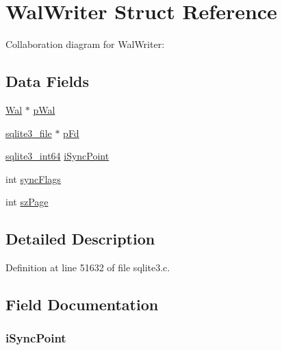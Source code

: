 \hypertarget{struct_wal_writer}{}\section{Wal\+Writer Struct Reference}
\label{struct_wal_writer}


Collaboration diagram for Wal\+Writer\+:
\subsection*{Data Fields}
\begin{DoxyCompactItemize}
\item 
\hyperlink{struct_wal}{Wal} $\ast$ \hyperlink{struct_wal_writer_ac5f3cfd978474a39e7462844ec1a6fe1}{p\+Wal}
\item 
\hyperlink{structsqlite3__file}{sqlite3\+\_\+file} $\ast$ \hyperlink{struct_wal_writer_ae44362cf35caac454319be8c145e374e}{p\+Fd}
\item 
\hyperlink{sqlite3_8c_a0a4d3e6c1ad46f90e746b920ab6ca0d2}{sqlite3\+\_\+int64} \hyperlink{struct_wal_writer_acdb124ba6cd2b23fde69c6e27a98e0c4}{i\+Sync\+Point}
\item 
int \hyperlink{struct_wal_writer_a3a81127b799c852f4dd1758b0390d48d}{sync\+Flags}
\item 
int \hyperlink{struct_wal_writer_a0ead96b04a1cc6dc6ec781782e82d052}{sz\+Page}
\end{DoxyCompactItemize}


\subsection{Detailed Description}


Definition at line 51632 of file sqlite3.\+c.



\subsection{Field Documentation}
\hypertarget{struct_wal_writer_acdb124ba6cd2b23fde69c6e27a98e0c4}{}
\subsubsection[{i\+Sync\+Point}]{ i\+Sync\+Point}\label{struct_wal_writer_acdb124ba6cd2b23fde69c6e27a98e0c4}


